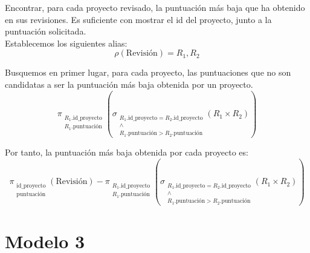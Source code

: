 \documentclass[12pt]{article}
\begin{document}
\begin{ejercicio}[AR]
    Encontrar, para cada proyecto revisado, la puntuación más baja que ha obtenido en sus revisiones. Es suficiente con mostrar el id del proyecto, junto a la puntuación solicitada.\\

    Establecemos los siguientes alias:
    \begin{equation*}
        \rho(\text{Revisión})=R_1,R_2
    \end{equation*}

    Busquemos en primer lugar, para cada proyecto, las puntuaciones que no son candidatas a ser la puntuación más baja obtenida por un proyecto.
    \begin{equation*}
        \pi_{\substack{R_1.\text{id\_proyecto}\\R_1.\text{puntuación}}}\left(\sigma_{\substack{R_1.\text{id\_proyecto}=R_2.\text{id\_proyecto}\\\land\\R_1.\text{puntuación}>R_2.\text{puntuación}}}(R_1\times R_2)\right)
    \end{equation*}

    Por tanto, la puntuación más baja obtenida por cada proyecto es:
    \begin{equation*}
        \pi_{\substack{\text{id\_proyecto}\\\text{puntuación}}}\left(\text{Revisión}\right)
        -
        \pi_{\substack{R_1.\text{id\_proyecto}\\R_1.\text{puntuación}}}\left(\sigma_{\substack{R_1.\text{id\_proyecto}=R_2.\text{id\_proyecto}\\\land\\R_1.\text{puntuación}>R_2.\text{puntuación}}}(R_1\times R_2)\right)
    \end{equation*}
\end{ejercicio}


\newpage
\section{Modelo 3}\label{sec:modelo3}
\end{document}
